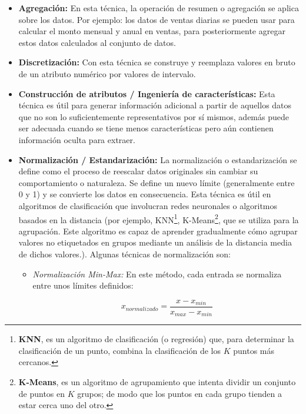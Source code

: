 \begin{itemize}
\item \textbf{Agregaci\'{o}n: }En esta t\'{e}cnica, la operaci\'{o}n de resumen o agregaci\'{o}n se aplica sobre los datos. Por ejemplo: los datos de ventas diarias se pueden usar para calcular el monto mensual y anual en ventas, para posteriormente agregar estos datos calculados al conjunto de datos.

\item \textbf{Discretizaci\'{o}n: }Con esta t\'{e}cnica se construye y reemplaza valores en bruto de un atributo num\'{e}rico por valores de intervalo.

\item \textbf{Construcci\'{o}n de atributos / Ingenier\'{i}a de caracter\'{i}sticas: }Esta t\'{e}cnica es \'{u}til para generar informaci\'{o}n adicional a partir de aquellos datos que no son lo suficientemente representativos por s\'{i} mismos, adem\'{a}s puede ser adecuada cuando se tiene menos caracter\'{i}sticas pero a\'{u}n contienen informaci\'{o}n oculta para extraer.

\item \textbf{Normalizaci\'{o}n / Estandarizaci\'{o}n: }La normalizaci\'{o}n o estandarizaci\'{o}n se define como el proceso de reescalar datos originales sin cambiar su comportamiento o naturaleza. Se define un nuevo l\'{i}mite (generalmente entre 0 y 1) y se convierte los datos en consecuencia. Esta t\'{e}cnica es \'{u}til en algoritmos de clasificaci\'{o}n que involucran redes neuronales o algoritmos basados en la distancia (por ejemplo, KNN\footnote{\textbf{KNN}, es un algoritmo de clasificaci\'{o}n (o regresi\'{o}n) que, para determinar la clasificaci\'{o}n de un punto, combina la clasificaci\'{o}n de los $K$ puntos m\'{a}s cercanos.}, K-Means\footnote{\textbf{K-Means}, es un algoritmo de agrupamiento que intenta dividir un conjunto de puntos en $K$ grupos; de modo que los puntos en cada grupo tienden a estar cerca uno del otro.}, que se utiliza para la agrupaci\'{o}n. Este algoritmo es capaz de aprender gradualmente c\'{o}mo agrupar valores no etiquetados en grupos mediante un an\'{a}lisis de la distancia media de dichos valores.). Algunas t\'{e}cnicas de normalizaci\'{o}n son:
\begin{itemize}
\item \textit{Normalizaci\'{o}n Min-Max: }En este m\'{e}todo, cada entrada se normaliza entre unos l\'{i}mites definidos:

\begin{equation}
x_{normalizado} = \frac{x - x_{min}}{x_{max}-x_{min}}
\end{equation}


\end{itemize}
\end{itemize}
